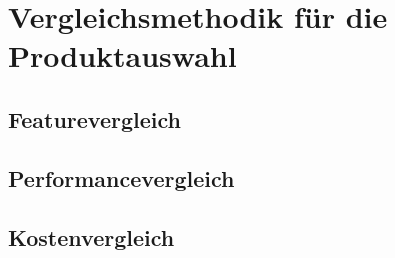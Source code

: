 \section{Vergleichsmethodik für die Produktauswahl}\label{chap:vergleichsmethodik}

\subsection{Featurevergleich}

\subsection{Performancevergleich}

\subsection{Kostenvergleich}